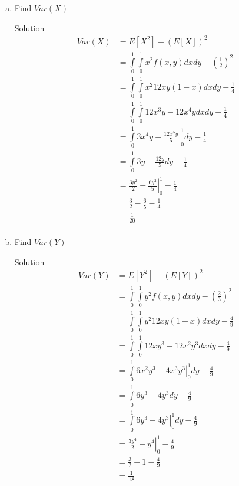 \documentclass{article}
\begin{document}
\begin{spacing}{1.1}
\begin{homeworkProblem}
\begin{enumerate}[(a)]
\begin{homeworkSection}{Solution}
\begin{align*}
          &= 2 - \frac{ 4}{ 3}\\
          &= \frac{ 2}{ 3}\\
        \end{align*}
      \end{homeworkSection}
    \item Find $Var( X)$
      \begin{homeworkSection}{Solution}
        \begin{align*}
          Var( X) &= E[ X^2] - (E[ X])^2\\
          &= \int\limits_0^1 \int\limits_0^1 x^2 f( x, y) dx dy - (\frac{ 1}{ 2})^2\\
          &= \int\limits_0^1 \int\limits_0^1 x^2 12 x y (1 - x) dx dy - \frac{ 1}{ 4}\\
          &= \int\limits_0^1 \int\limits_0^1 12 x^3 y - 12 x^4 y dx dy - \frac{ 1}{ 4}\\
          &= \int\limits_0^1 \left. 3 x^4 y 
            - \frac{ 12 x^5 y}{ 5} \right|_0^1 dy - \frac{ 1}{ 4}\\
          &= \int\limits_0^1  3 y - \frac{ 12 y}{ 5} dy - \frac{ 1}{ 4}\\
          &= \left. \frac{ 3 y^2}{ 2} 
            - \frac{ 6 y^2}{ 5} \right|_0^1 - \frac{ 1}{ 4}\\
          &= \frac{ 3}{ 2} - \frac{ 6}{ 5} - \frac{ 1}{ 4}\\
          &= \frac{ 1}{ 20}\\
        \end{align*}
      \end{homeworkSection}
    \item Find $Var( Y)$
      \begin{homeworkSection}{Solution}
        \begin{align*}
          Var( Y) &= E[ Y^2] - (E[ Y])^2\\
          &= \int\limits_0^1 \int\limits_0^1 y^2 f( x, y) dx dy - (\frac{ 2}{ 3})^2\\
          &= \int\limits_0^1 \int\limits_0^1 y^2 12 x y (1 - x) dx dy - \frac{ 4}{ 9}\\
          &= \int\limits_0^1 \int\limits_0^1 12 x y^3 - 12 x^2 y^3 dx dy - \frac{ 4}{ 9}\\
          &= \int\limits_0^1 \left.6 x^2 y^3 - 4 x^3 y^3 \right|_0^1 dy - \frac{ 4}{ 9}\\
          &= \int\limits_0^1 6 y^3 - 4 y^3 dy - \frac{ 4}{ 9}\\
          &= \int\limits_0^1 \left.6 y^3 - 4 y^3 \right|_0^1 dy - \frac{ 4}{ 9}\\
          &= \left.\frac{ 3y^4}{ 2}  - y^4 \right|_0^1 - \frac{ 4}{ 9}\\
          &= \frac{ 3}{ 2} - 1 - \frac{ 4}{ 9}\\
          &= \frac{ 1}{ 18}\\
        \end{align*}
        

\end{homeworkSection}
\end{enumerate}
\end{homeworkProblem}
\end{spacing}
\end{document}
